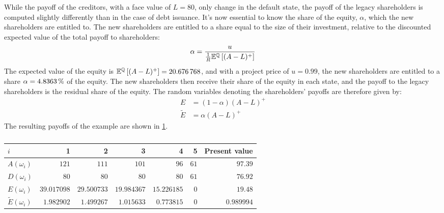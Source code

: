 \documentclass[main.tex]{subfiles}
\begin{document}
        While the payoff of the creditors, with a face value of $L = \num{80}$, 
        only change in the default state, 
        the payoff of the legacy shareholders is computed slightly differently than in the case of debt issuance. 
        It's now essential to know the share of the equity, $\alpha$, 
        which the new shareholders are entitled to.
        The new shareholders are entitled to a share equal to the size of their investment,
        relative to the discounted expected value of the total payoff to shareholders:
        \begin{equation}
            \alpha = 
                \frac{
                    u
                }{
                    \frac{1}{R}
                    \mathbb{E}^{\mathbb{Q}}\left[
                        (A - L)^{+}
                    \right]
                }
        \end{equation}
        The expected value of the equity is 
        $\mathbb{E}^{\mathbb{Q}}\left[(A - L)^{+}\right] = \num{20.676768}$,
        and with a project price of $u = 0.99$, the new shareholders are entitled to a share
        $\alpha = \pct{0.048363}$ of the equity.
        The new shareholders then receive their share of the equity in each state, 
        and the payoff to the legacy shareholders is the residual share of the equity.
        The random variables denoting the shareholders' payoffs are therefore given by:
            \begin{align}
                E 
                &= 
                (1 - \alpha)
                (A - L)^{+} 
                \\
                \tilde{E}
                &=
                \alpha
                (A - L)^{+}
            \end{align}
        The resulting payoffs of the example are shown in \cref{tbl:equity-funding-payoff}.
        \begin{table}[H]
            \centering\begin{tabular}{l|rrrrr||r}
                $i$ & 1 & 2 & 3 & 4 & 5 & Present value \\
                \hline
                $A(\omega_{i})$ & $\num{121}$ & $\num{111}$ & $\num{101}$ & $\num{96}$ & $\num{61}$ & $\num{97.39}$ \\
                $D(\omega_{i})$ & $\num{80}$ & $\num{80}$ & $\num{80}$ & $\num{80}$ & $\num{61}$ & $\num{76.92}$ \\
                $E(\omega_{i})$ & $\num{39.017098}$ & $\num{29.500733}$ & $\num{19.984367}$ & $\num{15.226185}$ & $\num{0}$ & $\num{19.48}$ \\
                $\tilde{E}(\omega_{i})$ & $\num{1.982902}$ & $\num{1.499267}$ & $\num{1.015633}$ & $\num{0.773815}$ & $\num{0}$ & $\num{0.989994}$ \\
            \end{tabular}
            \caption{}
            \label{tbl:equity-funding-payoff}
        \end{table}
\end{document}
